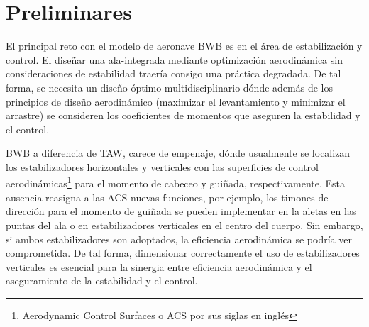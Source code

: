 
\section{Preliminares}

El principal reto con el modelo de aeronave BWB es en el área de estabilización y control. 
El diseñar una ala-integrada mediante optimización aerodinámica sin consideraciones de estabilidad traería consigo una práctica degradada. 
De tal forma, se necesita un diseño óptimo multidisciplinario dónde además de los principios de diseño aerodinámico (maximizar el levantamiento y minimizar el arrastre) se consideren los coeficientes de momentos que aseguren la estabilidad y el control. 

BWB a diferencia de TAW, carece de empenaje, dónde  usualmente se localizan los estabilizadores horizontales y verticales con las superficies de control aerodinámicas\footnote{Aerodynamic Control Surfaces o ACS por sus siglas en inglés} para el momento de cabeceo y guiñada, respectivamente. Esta ausencia reasigna a las ACS nuevas funciones, por ejemplo, los timones de dirección para el momento de guiñada se pueden implementar en la aletas en las puntas del ala o en estabilizadores verticales en el centro del cuerpo. Sin embargo, si ambos estabilizadores son adoptados, la eficiencia aerodinámica se podría ver comprometida. De tal forma, dimensionar correctamente el  uso de estabilizadores verticales es esencial para la sinergia entre eficiencia aerodinámica y el aseguramiento de la estabilidad y el control.

